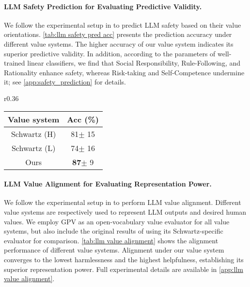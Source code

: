 \paragraph{LLM Safety Prediction for Evaluating Predictive Validity.}
We follow the experimental setup in \cite[Section 5.2]{ye2025gpv} to predict LLM safety based on their value orientations. \cref{tab:llm safety pred acc} presents the prediction accuracy under different value systems. The higher accuracy of our value system indicates its superior predictive validity.
In addition, according to the parameters of well-trained linear classifiers, we find that Social Responsibility, Rule-Following, and Rationality enhance safety, whereas Risk-taking and Self-Competence undermine it; see \cref{app:safety_prediction} for details.


\begin{wraptable}[9]{r}{0.36\linewidth}
        \centering
        \vspace{-4mm}
        \begin{tabular}{c|c}
            \toprule
            Value system & Acc (\%) \\
            \midrule
            Schwartz (H) & 81\tiny{$\pm$ 15} \\
            Schwartz (L) & 74\tiny{$\pm$ 16 } \\
            Ours & \textbf{87}\tiny{$\pm$ 9 } \\
            \bottomrule
        \end{tabular}
        \caption{Accuracy of LLM safety prediction based on values.}
        \label{tab:llm safety pred acc}
    \end{wraptable}


\paragraph{LLM Value Alignment for Evaluating Representation Power.}
We follow the experimental setup in \cite[Section 6.2]{yao2023value_fulcra} to perform LLM value alignment. Different value systems are respectively used to represent LLM outputs and desired human values. We employ GPV \cite{ye2025gpv} as an open-vocabulary value evaluator for all value systems, but also include the original results of \cite{yao2023value_fulcra} using its Schwartz-specific evaluator for comparison. \cref{tab:llm value alignment} shows the alignment performance of different value systems. Alignment under our value system converges to the lowest harmlessness and the highest helpfulness, establishing its superior representation power. Full experimental details are available in \cref{app:llm value alignment}.


